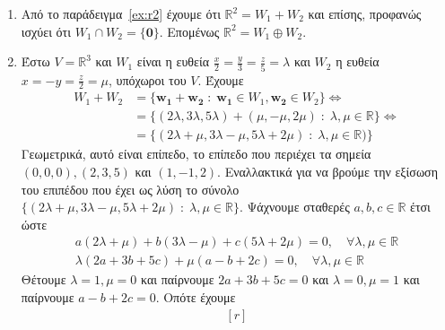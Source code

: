 \begin{examples}
\item {}
    \begin{enumerate}
        \item Από το παράδειγμα~\ref{ex:r2} έχουμε ότι $ \mathbb{R}^{2} = W_{1}+W_{2} $ 
            και επίσης, προφανώς ισχύει ότι $ W_{1} \cap W_{2} = \{ \mathbf{0} \} $. 
            Επομένως $ \mathbb{R}^{2} = W_{1} \oplus W_{2} $.
        \item Έστω $ V = \mathbb{R}^{3} $ και $ W_{1} $ είναι η ευθεία $ \frac{x}{2} = 
            \frac{y}{3} = \frac{z}{5} = \lambda$ και $ W_{2} $ η ευθεία $ x = -y = 
            \frac{z}{2} = \mu $, υπόχωροι του $ V $. Έχουμε
            \begin{align*}
                W_{1}+W_{2} 
                &= \{ 
                    \mathbf{w_{1}}+ \mathbf{w_{2}} \; : \; 
                    \mathbf{w_{1}} \in W_{1}, \mathbf{w_{2}} \in W_{2} 
                \} \Leftrightarrow \\
                &= \{ 
                    (2 \lambda, 3 \lambda, 5 \lambda ) + 
                    (\mu, - \mu, 2 \mu) \; : \; \lambda, \mu \in 
                    \mathbb{R} 
                \} \Leftrightarrow   \\ 
                &= \{ 
                    (2 \lambda + \mu, 3 \lambda - \mu, 5 \lambda + 2 
                    \mu) \; : \; \lambda, \mu \in \mathbb{R} ) 
                \} 
            \end{align*}
            Γεωμετρικά, αυτό είναι επίπεδο, το επίπεδο που περιέχει τα σημεία 
            $ (0,0,0), (2,3,5) $ και $ (1,-1,2) $. Εναλλακτικά για να βρούμε την 
            εξίσωση του επιπέδου που έχει ως λύση το σύνολο 
            $ \{ (2 \lambda + \mu , 3 \lambda - \mu, 5 \lambda + 2 \mu) \; : \; 
            \lambda, \mu \in \mathbb{R} \} $. Ψάχνουμε σταθερές 
            $ a,b,c \in \mathbb{R} $ έτσι ώστε 
            \begin{align*}
                a(2 \lambda + \mu ) + b(3 \lambda - \mu )+ c (5 \lambda + 2 \mu ) =
                0, \quad \forall \lambda, \mu \in \mathbb{R} \\
                \lambda (2a +3b+5c) + \mu (a-b+2c) = 0, \quad \forall \lambda, \mu 
                \in \mathbb{R}
            \end{align*} 
            Θέτουμε $ \lambda =1, \mu = 0 $ και παίρνουμε $ 2a+3b+5c =0 $ και 
            $ \lambda = 0, \mu =1 $ και παίρνουμε $ a-b+2c=0 $. Οπότε έχουμε
            \[
                \left.
                    \begin{matrix*}[r]

\end{matrix*}\]
\end{enumerate}
\end{examples}
